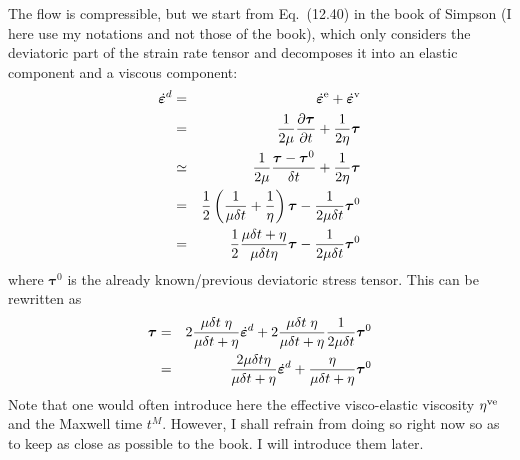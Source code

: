The flow is compressible, but we start from Eq.~(12.40) in the book of Simpson (I here use 
my notations and not those of the book), which only considers the deviatoric part of the 
strain rate tensor and decomposes it into an elastic component and a viscous component:
\begin{eqnarray}
\dot{\bm\varepsilon}^d
&=& \dot{\bm\varepsilon}^{\rm e} + \dot{\bm\varepsilon}^{\rm v} \nonumber\\
&=&\frac{1}{2\mu} \frac{\partial \bm\tau}{\partial t}
+\frac{1}{2\eta} \bm\tau \nonumber\\
&\simeq&
\frac{1}{2\mu} \frac{\bm\tau - \bm\tau^0}{\delta t}
+\frac{1}{2\eta} \bm\tau \nonumber\\
&=&
\frac12 \left( \frac{1}{\mu \delta t} + \frac{1}{\eta} \right) {\bm\tau}
-\frac{1}{2\mu \delta t} \bm\tau^0\nonumber\\
&=&
\frac12 \frac{ \mu\delta t +\eta}{\mu \delta t \eta}  {\bm\tau}
-\frac{1}{2\mu \delta t} \bm\tau^0
\end{eqnarray}
where ${\bm \tau}^0$ is the already known/previous deviatoric stress tensor. This can be rewritten as
\begin{eqnarray}
\bm\tau 
&=&
2  \frac{\mu \delta t \; \eta}{ \mu\delta t +\eta} \dot{\bm\varepsilon}^d 
+
2 \frac{\mu \delta t \; \eta}{\mu\delta t + \eta} \frac{1}{2\mu \delta t} \bm\tau^0
\nonumber\\
&=&
\frac{2 \mu \delta t \eta}{ \mu\delta t +\eta} \dot{\bm\varepsilon}^d 
+
\frac{ \eta}{\mu\delta t + \eta}  \bm\tau^0 \label{tau_simp1}
\end{eqnarray}
Note that one would often introduce here the effective visco-elastic 
viscosity $\eta^{\rm ve}$ and the Maxwell time $t^M$. However, I shall refrain 
from doing so right now so as to keep as close as possible to the book. 
I will introduce them later.

